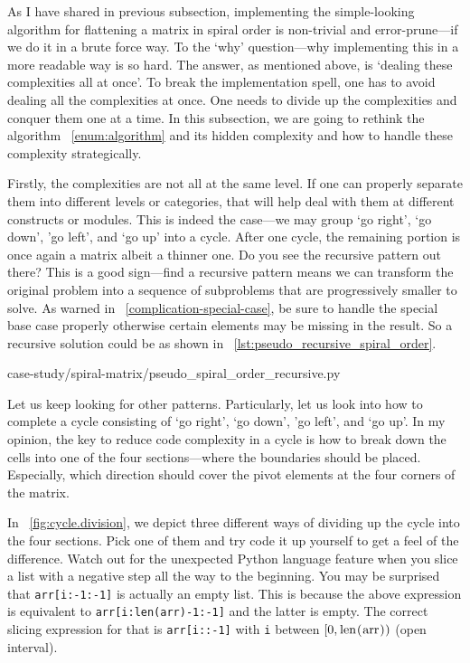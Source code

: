\documentclass[oneside,11pt]{book}
\theoremstyle{definition}
\theoremstyle{remark}
\newcommand{\code}[1]{\mbox{\lstinline{#1}}}
\newcommand{\python}{Python }
\begin{document}
As I have shared in previous subsection, implementing the simple-looking algorithm for flattening
a matrix in spiral order is non-trivial and error-prune---if we do it in a brute force way.
To the `why' question---why implementing this in a more readable way is so
hard.
The answer, as mentioned above, is `dealing these complexities all at once'.
To break the implementation spell, one has to avoid dealing all the complexities at once.
One needs to divide up the complexities and conquer them one at a time.
In this subsection, we are going to rethink the algorithm ~\autoref{enum:algorithm} and its
hidden complexity and how to handle these complexity strategically.

Firstly, the complexities are not all at the same level.
If one can properly separate them into different levels or categories, that will help deal with them
at different constructs or modules.
This is indeed the case---we may group `go right', `go down', 'go left', and `go up' into a cycle.
After one cycle, the remaining portion is once again a matrix albeit a thinner one.
Do you see the recursive pattern out there?
This is a good sign---find a recursive pattern means we can transform the original
problem into a sequence of subproblems that are progressively smaller to solve.
As warned in ~\autoref{complication-special-case}, be sure to handle the special base case properly
otherwise certain elements may be missing in the result.
So a recursive solution could be as shown in ~\autoref{lst:pseudo_recursive_spiral_order}.

\begin{clisting}
    
    {case-study/spiral-matrix/pseudo_spiral_order_recursive.py}
\end{clisting}
\newpage
Let us keep looking for other patterns.
Particularly, let us look into how to complete a cycle consisting of `go
right', `go down', 'go left', and `go up'.
In my opinion, the key to reduce code complexity in a cycle is how to break down the cells
into one of the four sections---where the boundaries should be placed.
Especially, which direction should cover the pivot elements at the four corners of the matrix.

In ~\autoref{fig:cycle.division}, we depict three different ways of dividing up the cycle into
the four sections.
Pick one of them and try code it up yourself to get a feel of the difference.
Watch out for the unexpected \python language feature when you slice a list
with a negative step all the way to the beginning.
You may be surprised that \code{arr[i:-1:-1]} is actually an empty list.
This is because the above expression is equivalent to \code{arr[i:len(arr)-1:-1]}
and the latter is empty.
The correct slicing expression for that is \code{arr[i::-1]} with \code{i} between $\left[0,
\mbox{\code{len(arr)}}\right)$ (open interval).
\end{document}
